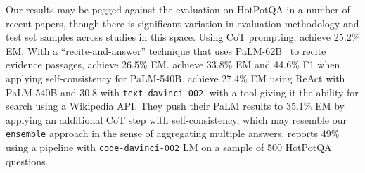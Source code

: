 Our results may be pegged against the evaluation on HotPotQA in a number of recent papers, though there is significant variation in evaluation methodology and test set samples across studies in this space. Using CoT prompting, \citet{si2022prompting} achieve 25.2\% EM. With a ``recite-and-answer'' technique that uses PaLM-62B~\citep{chowdhery2022palm} to recite evidence passages, \citet{sun2022recitation} achieve 26.5\% EM. \citet{wang2022rationale} achieve 33.8\% EM and 44.6\% F1 when applying self-consistency for PaLM-540B. \citet{yao2022react} achieve 27.4\% EM using ReAct with PaLM-540B and 30.8 with \texttt{text-davinci-002}, with a tool giving it the ability for search using a Wikipedia API. They push their PaLM results to 35.1\% EM by applying an additional CoT step with self-consistency, which may resemble our \texttt{ensemble} approach in the sense of aggregating multiple answers. \citet{trivedi2022interleaving} reports 49\% using a pipeline with \texttt{code-davinci-002} LM on a sample of 500 HotPotQA questions.























